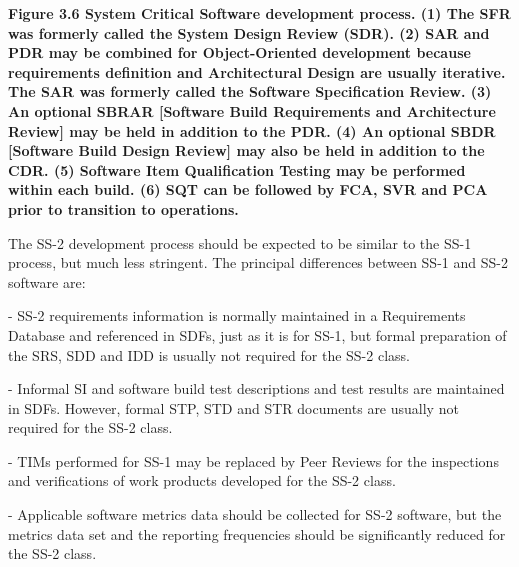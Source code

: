 \documentclass{book}
\begin{document}
\textbf{Figure 3.6 System Critical Software development process. (1) The SFR was formerly called the System Design Review
	(SDR). (2) SAR and PDR may be combined for Object-Oriented development because requirements definition and
	Architectural Design are usually iterative. The SAR was formerly called the Software Specification Review. (3) An
	optional SBRAR [Software Build Requirements and Architecture Review] may be held in addition to the PDR. (4) An
	optional SBDR [Software Build Design Review] may also be held in addition to the CDR. (5) Software Item Qualification
	Testing may be performed within each build. (6) SQT can be followed by FCA, SVR and PCA prior to transition to
	operations.}

The SS-2 development process should be expected to
be similar to the SS-1 process, but much less stringent. The
principal differences between SS-1 and SS-2 software are:

- SS-2 requirements information is normally maintained
in a Requirements Database and referenced in SDFs,
just as it is for SS-1, but formal preparation of the SRS,
SDD and IDD is usually not required for the SS-2 class.

- Informal SI and software build test descriptions
and test results are maintained in SDFs. However,
formal STP, STD and STR documents are usually not
required for the SS-2 class.

- TIMs performed for SS-1 may be replaced by Peer
Reviews for the inspections and verifications of work
products developed for the SS-2 class.

- Applicable software metrics data should be collected
for SS-2 software, but the metrics data set and the
reporting frequencies should be significantly reduced
for the SS-2 class.
\end{document}
